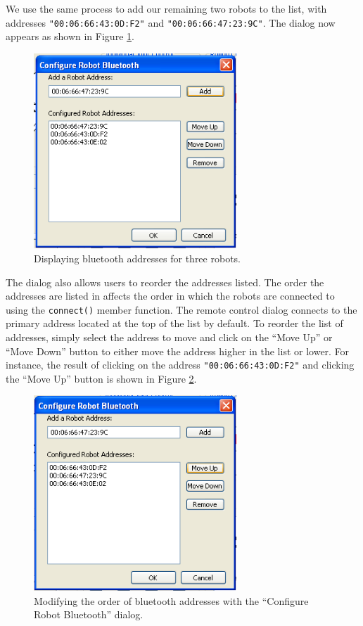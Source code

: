 \documentclass{article}
\begin{document}
We use the same process to add our remaining two robots to the list,
with addresses \texttt{"00:06:66:43:0D:F2"} and 
\texttt{"00:06:66:47:23:9C"}. The dialog now appears as shown in
Figure \ref{fig:shot8.png}.

\begin{figure}[H]
\begin{center}
\includegraphics[width=3in]{images/shot8.png}
\end{center}
\caption{\label{fig:shot8.png} Displaying bluetooth addresses for three robots.}
\end{figure}

The dialog also allows users to reorder the addresses listed. The
order the addresses are listed in affects the order in which the robots
are connected to using the \texttt{connect()} member function. 
The remote control dialog connects to the primary address located at the
top of the list by default. To reorder the list of addresses, simply
select the address to move and click on the ``Move Up'' or ``Move Down''
button to either move the address higher in the list or lower. For instance,
the result of clicking on the address \texttt{"00:06:66:43:0D:F2"} and clicking
the ``Move Up'' button is shown in Figure \ref{fig:shot10.png}.

\begin{figure}[H]
\begin{center}
\includegraphics[width=3in]{images/shot10.png}
\end{center}
\caption{\label{fig:shot10.png} Modifying the order of bluetooth addresses with the ``Configure Robot Bluetooth'' dialog.}
\end{figure}
\end{document}
